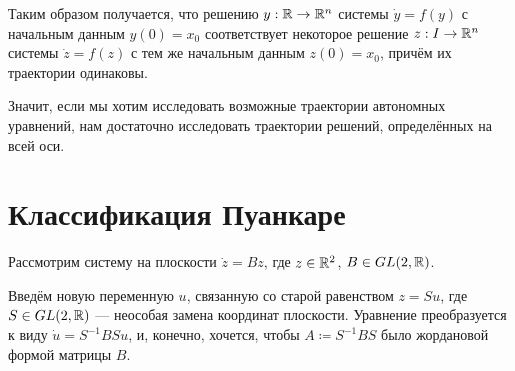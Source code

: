 \documentclass[a4paper]{report}
\begin{document}
    Таким образом получается, что решению $y: \mathbb{R} \rightarrow \mathbb{R}^n$ системы $\dot{y} = f(y)$ с начальным данным $y(0) = x_0$ соответствует некоторое решение $z: I \rightarrow \mathbb{R}^n$ системы $\dot{z} = f(z)$ с тем же начальным данным $z(0) = x_0$, причём их траектории одинаковы.

    Значит, если мы хотим исследовать возможные траектории автономных уравнений, нам достаточно исследовать траектории решений, определённых на всей оси.
    \section{Классификация Пуанкаре}
    Рассмотрим систему на плоскости $\dot{z} = Bz$, где $z \in \mathbb{R}^2$, $B \in GL(2, \mathbb{R})$.

    Введём новую переменную $u$, связанную со старой равенством $z = Su$, где $S \in GL(2, \mathbb{R})$ --- неособая замена координат плоскости.
    Уравнение преобразуется к виду $\dot{u} = S^{-1}BS u$, и, конечно, хочется, чтобы $A \coloneqq S^{-1}BS$ было жордановой формой матрицы $B$.
\end{document}
